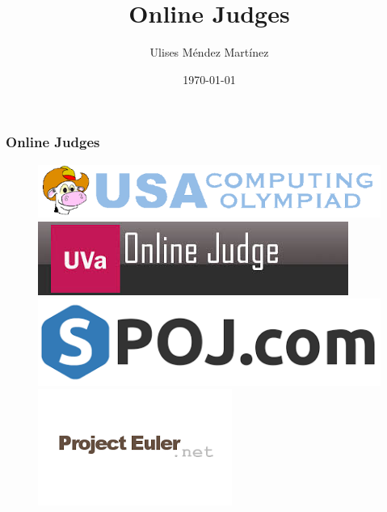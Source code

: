 \documentclass{beamer}
\title[Online Judges]{Online Judges} %
\author{Ulises M\'endez Mart\'{i}nez} %
\institute[UTM] %
{
Algorist Weekly Talks \\ %
\medskip
\textit{ulisesmdzmtz@gmail.com} %
}
\date{\today} %
\begin{document}
\begin{frame}
\titlepage %
\end{frame}


\begin{frame}
	\frametitle{Online Judges}
	\begin{figure}[!htb]
	  \href{http://www.usaco.org/}{\includegraphics[width=\linewidth]{images/judges/usaco}}
     \endminipage\hfill
      \href{https://uva.onlinejudge.org/}{\includegraphics[width=\linewidth]{images/judges/uva}}
     \endminipage\hfill
      \href{http://www.spoj.com/}{\includegraphics[width=\linewidth]{images/judges/spoj}}
     \endminipage\hfill
      \href{https://projecteuler.net/}{\includegraphics[width=\linewidth]{images/judges/projecteuler}}

\end{figure}
\end{frame}
\end{document}
